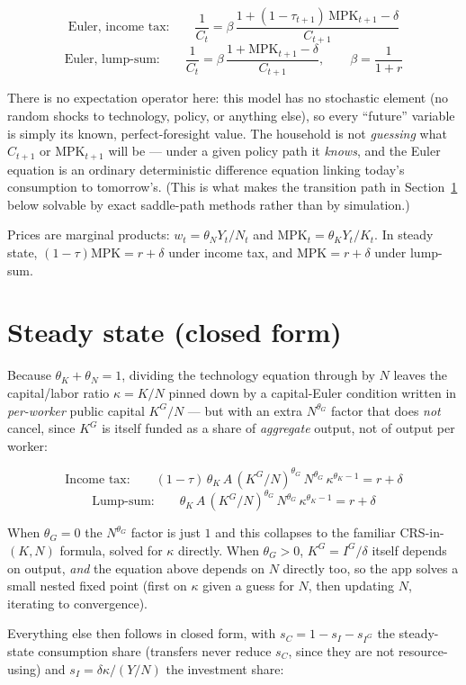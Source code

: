\documentclass[11pt]{article}
\newcommand{\eq}[1]{\begin{equation}#1\end{equation}}
\begin{document}
\eq{ \text{Euler, income tax:}\qquad \frac{1}{C_t} = \beta\,\frac{1+(1-\tau_{t+1})\,\mathrm{MPK}_{t+1}-\delta}{C_{t+1}} }
\eq{ \text{Euler, lump-sum:}\qquad \frac{1}{C_t} = \beta\,\frac{1+\mathrm{MPK}_{t+1}-\delta}{C_{t+1}},\qquad \beta=\frac{1}{1+r} }

There is no expectation operator here: this model has no stochastic
element (no random shocks to technology, policy, or anything else), so
every ``future'' variable is simply its known, perfect-foresight value.
The household is not \emph{guessing} what $C_{t+1}$ or $\mathrm{MPK}_{t+1}$
will be --- under a given policy path it \emph{knows}, and the Euler
equation is an ordinary deterministic difference equation linking today's
consumption to tomorrow's. (This is what makes the transition path in
Section~\ref{sec:steadystate} below solvable by exact saddle-path methods
rather than by simulation.)

Prices are marginal products: $w_t=\theta_N Y_t/N_t$ and
$\mathrm{MPK}_t=\theta_K Y_t/K_t$. In steady state, $(1-\tau)\mathrm{MPK}=r+\delta$
under income tax, and $\mathrm{MPK}=r+\delta$ under lump-sum.

\section{Steady state (closed form)}
\label{sec:steadystate}

Because $\theta_K+\theta_N=1$, dividing the technology equation through by
$N$ leaves the capital/labor ratio $\kappa=K/N$ pinned down by a
capital-Euler condition written in \emph{per-worker} public capital
$K^G/N$ --- but with an extra $N^{\theta_G}$ factor that does \emph{not}
cancel, since $K^G$ is itself funded as a share of \emph{aggregate} output,
not of output per worker:

\eq{ \text{Income tax:}\qquad (1-\tau)\,\theta_K\,A\,(K^G/N)^{\theta_G}\,N^{\theta_G}\,\kappa^{\theta_K-1} = r+\delta }
\eq{ \text{Lump-sum:}\qquad \theta_K\,A\,(K^G/N)^{\theta_G}\,N^{\theta_G}\,\kappa^{\theta_K-1} = r+\delta }

When $\theta_G=0$ the $N^{\theta_G}$ factor is just $1$ and this collapses
to the familiar CRS-in-$(K,N)$ formula, solved for $\kappa$ directly. When
$\theta_G>0$, $K^G=I^G/\delta$ itself depends on output, \emph{and} the
equation above depends on $N$ directly too, so the app solves a small
nested fixed point (first on $\kappa$ given a guess for $N$, then updating
$N$, iterating to convergence).

Everything else then follows in closed form, with
$s_C=1-s_I-s_{I^G}$ the steady-state consumption share (transfers never
reduce $s_C$, since they are not resource-using) and $s_I=\delta\kappa/(Y/N)$
the investment share:
\end{document}

